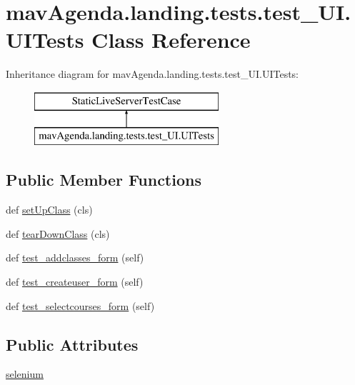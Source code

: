 \hypertarget{classmavAgenda_1_1landing_1_1tests_1_1test__UI_1_1UITests}{}\section{mav\+Agenda.\+landing.\+tests.\+test\+\_\+\+U\+I.\+U\+I\+Tests Class Reference}
\label{classmavAgenda_1_1landing_1_1tests_1_1test__UI_1_1UITests}
Inheritance diagram for mav\+Agenda.\+landing.\+tests.\+test\+\_\+\+U\+I.\+U\+I\+Tests\+:\begin{figure}[H]
\begin{center}
\leavevmode
\includegraphics[height=2.000000cm]{classmavAgenda_1_1landing_1_1tests_1_1test__UI_1_1UITests}
\end{center}
\end{figure}
\subsection*{Public Member Functions}
\begin{DoxyCompactItemize}
\item 
def \mbox{\hyperlink{classmavAgenda_1_1landing_1_1tests_1_1test__UI_1_1UITests_a66041a2c1743ba6e5b8ed20180c4a586}{set\+Up\+Class}} (cls)
\item 
def \mbox{\hyperlink{classmavAgenda_1_1landing_1_1tests_1_1test__UI_1_1UITests_a650b4a7217f6c9ee98562af086085eb2}{tear\+Down\+Class}} (cls)
\item 
def \mbox{\hyperlink{classmavAgenda_1_1landing_1_1tests_1_1test__UI_1_1UITests_a7cfdbe1460aac92541249bfcc1a9abef}{test\+\_\+addclasses\+\_\+form}} (self)
\item 
def \mbox{\hyperlink{classmavAgenda_1_1landing_1_1tests_1_1test__UI_1_1UITests_ae53ad10b481857ef10e977d43c3919e7}{test\+\_\+createuser\+\_\+form}} (self)
\item 
def \mbox{\hyperlink{classmavAgenda_1_1landing_1_1tests_1_1test__UI_1_1UITests_aabf40f86f8f79a11c5be81b894162a4d}{test\+\_\+selectcourses\+\_\+form}} (self)
\end{DoxyCompactItemize}
\subsection*{Public Attributes}
\begin{DoxyCompactItemize}
\item 
\mbox{\hyperlink{classmavAgenda_1_1landing_1_1tests_1_1test__UI_1_1UITests_a3278a0c229f895e59c1f14d7d45257ad}{selenium}}
\end{DoxyCompactItemize}


